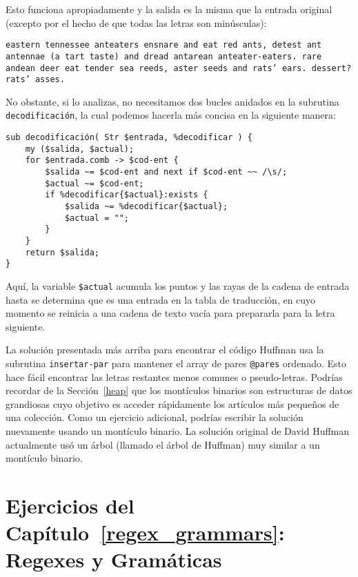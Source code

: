 Esto funciona apropiadamente y la salida es la misma que 
la entrada original (excepto por el hecho de que todas las letras
son minúsculas):

\begin{verbatim}
eastern tennessee anteaters ensnare and eat red ants, detest ant
antennae (a tart taste) and dread antarean anteater-eaters. rare
andean deer eat tender sea reeds, aster seeds and rats’ ears. dessert?
rats’ asses.
\end{verbatim}

No obstante, si lo analizas, no necesitamos dos bucles anidados
en la subrutina {\tt decodificación}, la cual podemos hacerla
más concisa en la siguiente manera:

\begin{verbatim}
sub decodificación( Str $entrada, %decodificar ) {
    my ($salida, $actual);
    for $entrada.comb -> $cod-ent {
        $salida ~= $cod-ent and next if $cod-ent ~~ /\s/;
        $actual ~= $cod-ent;
        if %decodificar{$actual}:exists {
            $salida ~= %decodificar{$actual};
            $actual = "";
        }
    }
    return $salida;
}
\end{verbatim}

Aquí, la variable \verb|$actual| acumula los puntos y las rayas
de la cadena de entrada hasta se determina que es una entrada en la tabla
de traducción, en cuyo momento se reinicia a una cadena de texto vacía
para prepararla para la letra siguiente.

La solución presentada más arriba para encontrar el código Huffman
usa la subrutina {\tt insertar-par} para mantener el array de pares
\verb|@pares| ordenado. Esto hace fácil encontrar las letras 
restantes menos comunes o pseudo-letras. Podrías recordar de la
Sección~\ref{heap} que los montículos binarios son estructuras de 
datos grandiosas cuyo objetivo es acceder rápidamente los artículos 
más pequeños de una colección. Como un ejercicio adicional, podrías
escribir la solución nuevamente usando un montículo binario. La
solución original de David Huffman actualmente usó un árbol (llamado
el árbol de Huffman) muy similar a un montículo binario.



\section{Ejercicios del Capítulo~\ref{regex_grammars}: Regexes y Gramáticas}

